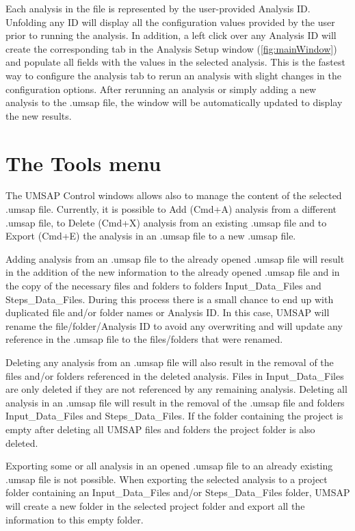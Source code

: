 Each analysis in the file is represented by the user-provided Analysis ID. Unfolding
any ID will display all the configuration values provided by the user prior to running
the analysis. In addition, a left click over any Analysis ID will create the corresponding
tab in the Analysis Setup window (\autoref{fig:mainWindow}) and populate all fields
with the values in the selected analysis. This is the fastest way to configure the
analysis tab to rerun an analysis with slight changes in the configuration options.
After rerunning an analysis or simply adding a new analysis to the .umsap file, the
window will be automatically updated to display the new results.

\section{The Tools menu}

The UMSAP Control windows allows also to manage the content of the selected .umsap
file. Currently, it is possible to Add (Cmd+A) analysis from a different .umsap
file, to Delete (Cmd+X) analysis from an existing .umsap file and to Export (Cmd+E)
the analysis in an .umsap file to a new .umsap file.

Adding analysis from an .umsap file to the already opened .umsap file will result
in the addition of the new information to the already opened .umsap file and in the
copy of the necessary files and folders to folders Input{\_}Data{\_}Files and
Steps{\_}Data{\_}Files. During this process there is a small chance to end up with
duplicated file and/or folder names or Analysis ID. In this case, UMSAP will rename
the file/folder/Analysis ID to avoid any overwriting and will update any reference
in the .umsap file to the files/folders that were renamed.

Deleting any analysis from an .umsap file will also result in the removal of the
files and/or folders referenced in the deleted analysis. Files in Input{\_}Data{\_}Files
are only deleted if they are not referenced by any remaining analysis. Deleting
all analysis in an .umsap file will result in the removal of the .umsap file and folders
Input{\_}Data{\_}Files and Steps{\_}Data{\_}Files. If the folder containing the
project is empty after deleting all UMSAP files and folders the project folder is
also deleted.

Exporting some or all analysis in an opened .umsap file to an already existing .umsap
file is not possible. When exporting the selected analysis to a project folder containing
an Input{\_}Data{\_}Files and/or Steps{\_}Data{\_}Files folder, UMSAP will create a new
folder in the selected project folder and export all the information to this empty
folder.


